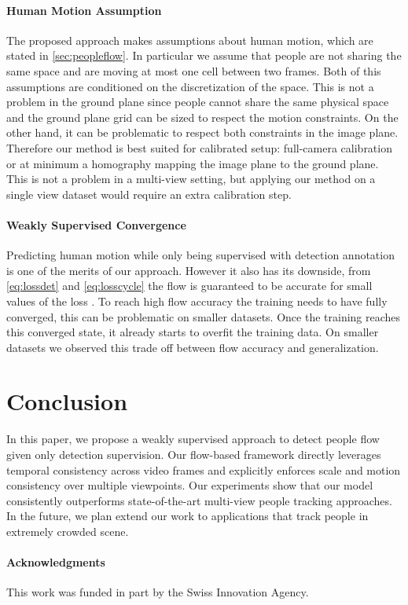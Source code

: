 \documentclass[10pt,twocolumn,letterpaper]{article}
\begin{document}
 \paragraph*{Human Motion Assumption} 
 
 The proposed approach makes assumptions about human motion, which are stated in \cref{sec:peopleflow}. 
 In particular we assume that people are not sharing the same space and are moving at most one cell between two frames. 
 Both of this assumptions are conditioned on the discretization of the space. This is not a problem in the ground plane since people cannot share the same physical space and the ground plane grid can be sized to respect the motion constraints. On the other hand, it can be problematic to respect both constraints in the image plane. Therefore our method is best suited for calibrated setup: 
 full-camera calibration or at minimum a homography mapping the image plane to the ground plane. This is not a problem in a multi-view setting, but applying our method on a single view dataset would require an extra calibration step.

\paragraph*{Weakly Supervised Convergence} 

Predicting human motion while only being supervised with detection annotation is one of the merits of our approach. However it also has its downside, from \cref{eq:lossdet} and \cref{eq:losscycle} the flow is guaranteed to be accurate for small values of the loss .
To reach high flow accuracy the training needs to have fully converged, this can be problematic on smaller datasets. Once the training reaches this converged state, it already starts to overfit the training data. On smaller datasets we observed this trade off between flow accuracy and generalization.







  
\section{Conclusion}\label{sec:conclusion}
 In this paper, we propose a weakly supervised approach to detect people flow given only detection supervision. Our flow-based framework directly leverages temporal consistency across video frames and explicitly enforces scale and motion consistency over multiple viewpoints. Our experiments show that our model consistently outperforms state-of-the-art multi-view people tracking approaches. In the future, we plan extend our work to applications that track people in extremely crowded scene.  
 \paragraph{Acknowledgments} This work was funded in part by the Swiss Innovation Agency.

 
 \clearpage


{\small


}
\end{document}
